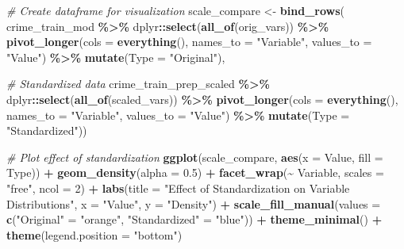 \documentclass[
]{article}
\newenvironment{Shaded}{\begin{snugshade}}{\end{snugshade}}
\newcommand{\AttributeTok}[1]{\textcolor[rgb]{0.13,0.29,0.53}{#1}}
\newcommand{\CommentTok}[1]{\textcolor[rgb]{0.56,0.35,0.01}{\textit{#1}}}
\newcommand{\DecValTok}[1]{\textcolor[rgb]{0.00,0.00,0.81}{#1}}
\newcommand{\FloatTok}[1]{\textcolor[rgb]{0.00,0.00,0.81}{#1}}
\newcommand{\FunctionTok}[1]{\textcolor[rgb]{0.13,0.29,0.53}{\textbf{#1}}}
\newcommand{\NormalTok}[1]{#1}
\newcommand{\OtherTok}[1]{\textcolor[rgb]{0.56,0.35,0.01}{#1}}
\newcommand{\SpecialCharTok}[1]{\textcolor[rgb]{0.81,0.36,0.00}{\textbf{#1}}}
\newcommand{\StringTok}[1]{\textcolor[rgb]{0.31,0.60,0.02}{#1}}
\begin{document}
\begin{Shaded}
\begin{Highlighting}[]
\CommentTok{\# Create dataframe for visualization}
\NormalTok{scale\_compare }\OtherTok{\textless{}{-}} \FunctionTok{bind\_rows}\NormalTok{(}
\NormalTok{  crime\_train\_mod }\SpecialCharTok{\%\textgreater{}\%}
\NormalTok{    dplyr}\SpecialCharTok{::}\FunctionTok{select}\NormalTok{(}\FunctionTok{all\_of}\NormalTok{(orig\_vars)) }\SpecialCharTok{\%\textgreater{}\%}
    \FunctionTok{pivot\_longer}\NormalTok{(}\AttributeTok{cols =} \FunctionTok{everything}\NormalTok{(), }
                 \AttributeTok{names\_to =} \StringTok{"Variable"}\NormalTok{, }
                 \AttributeTok{values\_to =} \StringTok{"Value"}\NormalTok{) }\SpecialCharTok{\%\textgreater{}\%}
    \FunctionTok{mutate}\NormalTok{(}\AttributeTok{Type =} \StringTok{"Original"}\NormalTok{),}
  
  \CommentTok{\# Standardized data}
\NormalTok{  crime\_train\_prep\_scaled }\SpecialCharTok{\%\textgreater{}\%}
\NormalTok{    dplyr}\SpecialCharTok{::}\FunctionTok{select}\NormalTok{(}\FunctionTok{all\_of}\NormalTok{(scaled\_vars)) }\SpecialCharTok{\%\textgreater{}\%}
    \FunctionTok{pivot\_longer}\NormalTok{(}\AttributeTok{cols =} \FunctionTok{everything}\NormalTok{(), }
                 \AttributeTok{names\_to =} \StringTok{"Variable"}\NormalTok{, }
                 \AttributeTok{values\_to =} \StringTok{"Value"}\NormalTok{) }\SpecialCharTok{\%\textgreater{}\%}
    \FunctionTok{mutate}\NormalTok{(}\AttributeTok{Type =} \StringTok{"Standardized"}\NormalTok{))}

\CommentTok{\# Plot effect of standardization}
\FunctionTok{ggplot}\NormalTok{(scale\_compare, }\FunctionTok{aes}\NormalTok{(}\AttributeTok{x =}\NormalTok{ Value, }\AttributeTok{fill =}\NormalTok{ Type)) }\SpecialCharTok{+}
  \FunctionTok{geom\_density}\NormalTok{(}\AttributeTok{alpha =} \FloatTok{0.5}\NormalTok{) }\SpecialCharTok{+}
  \FunctionTok{facet\_wrap}\NormalTok{(}\SpecialCharTok{\textasciitilde{}}\NormalTok{ Variable, }\AttributeTok{scales =} \StringTok{"free"}\NormalTok{, }\AttributeTok{ncol =} \DecValTok{2}\NormalTok{) }\SpecialCharTok{+}
  \FunctionTok{labs}\NormalTok{(}\AttributeTok{title =} \StringTok{"Effect of Standardization on Variable Distributions"}\NormalTok{,}
       \AttributeTok{x =} \StringTok{"Value"}\NormalTok{, }\AttributeTok{y =} \StringTok{"Density"}\NormalTok{) }\SpecialCharTok{+}
  \FunctionTok{scale\_fill\_manual}\NormalTok{(}\AttributeTok{values =} \FunctionTok{c}\NormalTok{(}\StringTok{"Original"} \OtherTok{=} \StringTok{"orange"}\NormalTok{, }\StringTok{"Standardized"} \OtherTok{=} \StringTok{"blue"}\NormalTok{)) }\SpecialCharTok{+}
  \FunctionTok{theme\_minimal}\NormalTok{() }\SpecialCharTok{+}
  \FunctionTok{theme}\NormalTok{(}\AttributeTok{legend.position =} \StringTok{"bottom"}\NormalTok{)}
\end{Highlighting}
\end{Shaded}
\end{document}
